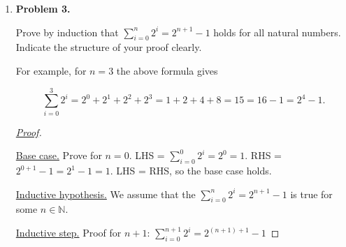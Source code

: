 \documentclass[11pt]{article}
\begin{document}
\begin{enumerate}
\begin{proof}[\underline{Proof}]
\

\underline{Base case.} If $n=1$, then \(n^3+2n = 1^3 + 2\cdot 1 = 3\), which is divisible by $3$. (If one includes $n=0$ as natural, then $0^3 + 2\cdot 0 = 0$ is also divisible by $3$.)

\underline{Inductive hypothesis.} Assume that for some $k \in \mathbb{N}$, the number $k^3 + 2k$ is divisible by $3$, i.e.,
\[
k^3 + 2k = 3m \quad \text{for some } m \in \mathbb{Z}.
\]

\underline{Inductive step.} We must show that $(k+1)^3 + 2(k+1)$ is also divisible by $3$:

\[
\begin{aligned}
(k+1)^3+2(k+1)
&= \big(k^3+3k^2+3k+1\big)+2k+2 \\
&= \underbrace{(k^3+2k)}_{\text{multiple of }3 \text{ by IH}} \;+\; \underbrace{3k^2+3k+3}_{=3(k^2+k+1)}.
\end{aligned}
\]

By the inductive hypothesis, $k^3+2k$ is divisible by $3$, and clearly $3(k^2+k+1)$ is also divisible by $3$.  
Thus, their sum is divisible by $3$.

\underline{Conclusion.} By the principle of mathematical induction, $n^3 + 2n$ is divisible by $3$ for all natural numbers $n$.

\end{proof}

\item
\textbf{Problem 3.}

Prove by induction that \(\displaystyle\sum_{i=0}^{n} 2^i = 2^{n+1} - 1\) holds for all natural numbers. Indicate the structure of your proof clearly.

For example, for \(n=3\) the above formula gives

\[
\sum_{i=0}^{3} 2^i = 2^0 + 2^1 + 2^2 + 2^3 = 1 + 2 + 4 + 8 = 15 = 16 - 1 = 2^4 - 1.
\]

\begin{proof}[\underline{Proof}]
\

\underline{Base case.} Prove for \(n=0\). LHS = \(\displaystyle\sum_{i=0}^{0} 2^i = 2^0 = 1\). RHS = \(2^{0+1} - 1 = 2^1 - 1 = 1\). LHS = RHS, so the base case holds.

\underline{Inductive hypothesis.} We assume that the \(\displaystyle\sum_{i=0}^{n} 2^i = 2^{n+1} - 1\) is true for some \(n \in \mathbb{N}\).

\underline{Inductive step.} Proof for \(n+1\):
\(\displaystyle\sum_{i=0}^{n+1} 2^i = 2^{(n+1)+1} - 1\)


\end{proof}
\end{enumerate}
\end{document}
